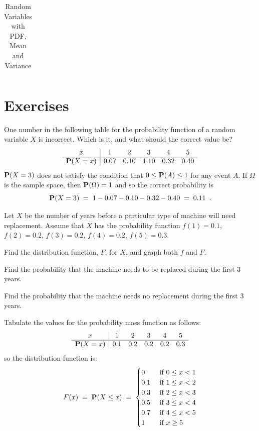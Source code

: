\begin{table}[ht]
\begin{tabular}{|c|c|c|c|}
\hline
\end{tabular}
\caption{Random Variables with PDF, Mean and Variance}
\end{table}

\newpage
\section*{Exercises}

\begin{ExerciseList}
\Exercise
One number in the following table for the probability function of a random variable $X$ is incorrect.  
Which is it, and what should the correct value be?
$$
\begin{array}{c|ccccc}
x&1&2&3&4&5\\\hline
\mathbf{P}(X=x)&0.07&0.10&1.10&0.32&0.40
\end{array}
$$
\Answer
$\mathbf{P}(X=3)$ does not satisfy the condition that $0\leq \mathbf{P}(A)\leq1$ for any event $A$.  
If $\Omega$ is the sample space, then $\mathbf{P}(\Omega)=1$ and so  the correct probability is 
\[
\mathbf{P}(X=3)\;=\;1-0.07-0.10-0.32-0.40\;=\;0.11 \enspace .
\]

\Exercise
Let $X$ be the number of years before a particular type of machine will need replacement.  
Assume that $X$ has the probability function $f(1)=0.1$, $f(2)=0.2$, $f(3)=0.2$, $f(4)=0.2$, $f(5)=0.3$.
\be
\item Find the distribution
  function, $F$,  for $X$, and graph both $f$ and $F$.

\item  Find the probability that the machine needs to be
  replaced during the first 3 years.

\item  Find the probability that the machine needs no
  replacement during the first 3 years.
\ee
\Answer
\be
\item  Tabulate the values for the probability mass function  as follows: $$
\begin{array}{c|ccccc}
x&1&2&3&4&5\\\hline
\mathbf{P}(X=x)&0.1&0.2&0.2&0.2&0.3
\end{array}
$$so the  distribution function is:
\[F(x)\; = \;\mathbf{P}(X \leq x) \;=\;
\begin{cases}
 0 & \text{ if }  0 \leq   x < 1\\
 0.1 & \text{ if } 1 \leq  x < 2\\
0.3 & \text{ if } 2 \leq x < 3\\
 0.5 & \text{ if } 3 \leq x < 4\\
0.7 & \text{ if }  4 \leq x < 5\\
 1& \text{ if }    x \geq 5
\end{cases}
\]


\end{ExerciseList}
